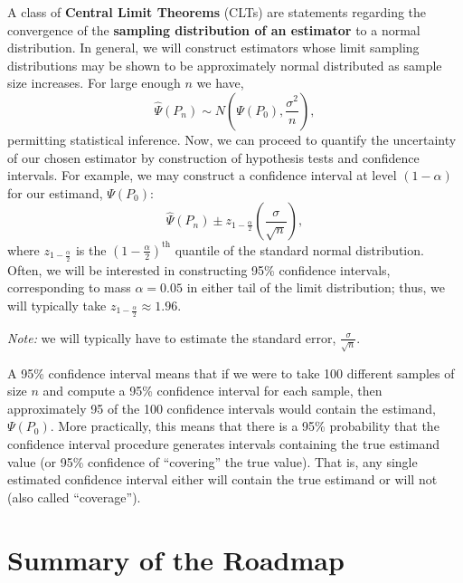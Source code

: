 \documentclass[
  12pt, krantz2,
]{book}
\theoremstyle{definition}
\theoremstyle{definition}
\theoremstyle{definition}
\newcommand{\1}{\mathbbm{1}}
\begin{document}
A class of \textbf{Central Limit Theorems} (CLTs) are statements regarding the
convergence of the \textbf{sampling distribution of an estimator} to a normal
distribution. In general, we will construct estimators whose limit sampling
distributions may be shown to be approximately normal distributed as sample size
increases. For large enough \(n\) we have,
\begin{equation*}
  \hat{\Psi}(P_n) \sim N \left(\Psi(P_0), \frac{\sigma^2}{n}\right),
\end{equation*}
permitting statistical inference. Now, we can proceed to quantify the
uncertainty of our chosen estimator by construction of hypothesis tests and
confidence intervals. For example, we may construct a confidence interval at
level \((1 - \alpha)\) for our estimand, \(\Psi(P_0)\):
\begin{equation*}
  \hat{\Psi}(P_n) \pm z_{1 - \frac{\alpha}{2}}
    \left(\frac{\sigma}{\sqrt{n}}\right),
\end{equation*}
where \(z_{1 - \frac{\alpha}{2}}\) is the \((1 - \frac{\alpha}{2})^\text{th}\)
quantile of the standard normal distribution. Often, we will be interested in
constructing 95\% confidence intervals, corresponding to mass \(\alpha = 0.05\) in
either tail of the limit distribution; thus, we will typically take
\(z_{1 - \frac{\alpha}{2}} \approx 1.96\).

\emph{Note:} we will typically have to estimate the standard error,
\(\frac{\sigma}{\sqrt{n}}\).

A 95\% confidence interval means that if we were to take 100 different samples
of size \(n\) and compute a 95\% confidence interval for each sample, then
approximately 95 of the 100 confidence intervals would contain the estimand,
\(\Psi(P_0)\). More practically, this means that there is a 95\% probability
that the confidence interval procedure generates intervals containing the
true estimand value (or 95\% confidence of ``covering'' the true value). That is,
any single estimated confidence interval either will contain the true estimand
or will not (also called ``coverage'').

\hypertarget{roadmap-summary}{%
\section{Summary of the Roadmap}\label{roadmap-summary}}
\end{document}
